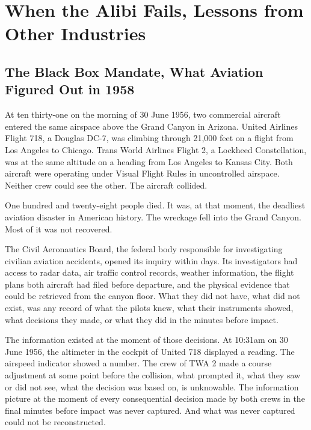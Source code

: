 
\part{When the Alibi Fails, Lessons from Other Industries}

\chapter{The Black Box Mandate, What Aviation Figured Out in 1958}

At ten thirty-one on the morning of 30 June 1956, two commercial aircraft entered the same airspace above the Grand Canyon in Arizona. United Airlines Flight 718, a Douglas DC-7, was climbing through 21,000 feet on a flight from Los Angeles to Chicago. Trans World Airlines Flight 2, a Lockheed Constellation, was at the same altitude on a heading from Los Angeles to Kansas City. Both aircraft were operating under Visual Flight Rules in uncontrolled airspace. Neither crew could see the other. The aircraft collided.

One hundred and twenty-eight people died. It was, at that moment, the deadliest aviation disaster in American history. The wreckage fell into the Grand Canyon. Most of it was not recovered.

The Civil Aeronautics Board, the federal body responsible for investigating civilian aviation accidents, opened its inquiry within days. Its investigators had access to radar data, air traffic control records, weather information, the flight plans both aircraft had filed before departure, and the physical evidence that could be retrieved from the canyon floor. What they did not have, what did not exist, was any record of what the pilots knew, what their instruments showed, what decisions they made, or what they did in the minutes before impact.

The information existed at the moment of those decisions. At 10:31am on 30 June 1956, the altimeter in the cockpit of United 718 displayed a reading. The airspeed indicator showed a number. The crew of TWA 2 made a course adjustment at some point before the collision, what prompted it, what they saw or did not see, what the decision was based on, is unknowable. The information picture at the moment of every consequential decision made by both crews in the final minutes before impact was never captured. And what was never captured could not be reconstructed.

